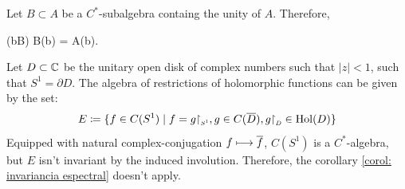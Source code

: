 \begin{corolario}
\label{corol: invariancia espectral}
Let $B \subset A$ be a $C^*$-subalgebra containg the unity of $A$. Therefore,
\begin{eqspaced*}{(b\in B)}
\sub \Spec B(b) = \sub \Spec A(b).
\end{eqspaced*}
\end{corolario}

\begin{contraexemplo}
Let $D \subset \operatorname{\mathbb{C}}$ be the unitary open disk of complex numbers such that $|z|<1$, such that $S^1 = \partial D$. The algebra of restrictions of holomorphic functions can be given by the set:
\begin{equation*}
    E \coloneqq \{f \in C(S^1) \mid f = g\sub\restrita{S^1}, g \in C(\con D), g \sub\restrita D \in \operatorname{Hol}(D) \}
\end{equation*}
Equipped with natural complex-conjugation $f \longmapsto \overline{f}$, $C(S^1)$ is a $C^*$-algebra, but $E$ isn't invariant by the induced involution. Therefore, the corollary \ref{corol: invariancia espectral} doesn't apply.
\end{contraexemplo}


